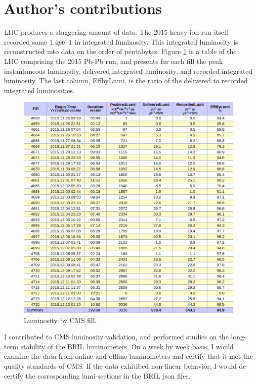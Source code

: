 \section{Author's contributions}

LHC produces a staggering amount of data. The 2015 heavy-ion run itself recorded some $1.4 pb^-1$ in integrated luminosity. This integrated luminosity is reconstructed into data on the order of pentabytes. Figure \ref{fig:lumiFill} is a table of the LHC comprising the 2015 Pb-Pb run, and presents for each fill the peak instantaneous luminosity, delivered integrated luminosity, and recorded integrated luminosity. The last column, EffbyLumi, is the ratio of the delivered to recorded integrated luminosities.  

\begin{figure}[h!]
\begin{centering}
\includegraphics[width=6in]{Chapter4/importfigs/lumiFill.png}
\par\end{centering}
\caption{Luminosity by CMS fill. \label{fig:lumiFill}}
\end{figure}

I contributed to CMS luminosity validation, and performed studies on the long-term stability of the BRIL luminometers. On a week by week basis, I would examine the data from online and offline luminometers and certify that it met the quality standards of CMS. If the data exhitibed non-linear behavior, I would de-certify the corresponding lumi-sections in the BRIL json files.

